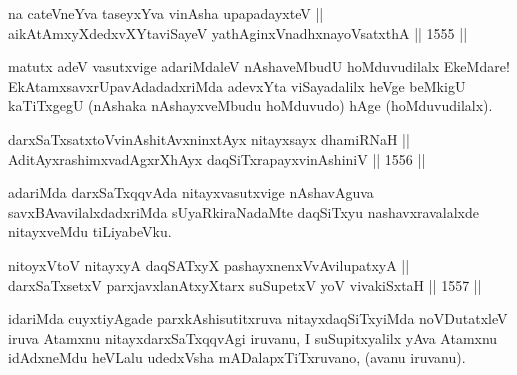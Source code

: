 
\begin{shl}
na ca\footnotemark[2] teVneYva taseyxYva vinAsha upapadayxteV || \\
aikAtAmxyXdedxvXYtaviSayeV yathA\s ginxVnadhxnayoVsatxthA ||  1555 ||  
\end{shl}

\begin{artha}
matutx adeV vasutxvige adariMdaleV nAshaveMbudU hoMduvudilalx EkeMdare! EkAtamxsavxrUpavAdadadxriMda adevxYta viSayadalilx heVge beMkigU kaTiTxgegU (nAshaka nAshayxveMbudu hoMduvudo) hAge (hoMduvudilalx).
\end{artha}


\begin{shl}
\footnotemark[3]darxSaTxsatxtoV\s vinAshitAvxninxtAyx nitayxsayx dhamiRNaH ||  \\
AditAyxrashimxvadAgxrXhAyx daqSiTxrapayxvinAshiniV ||  1556 ||
\end{shl}

\begin{artha}
adariMda darxSaTxqqvAda nitayxvasutxvige nAshavAguva savxBAvavilalxdadxriMda sUyaRkiraNadaMte daqSiTxyu nashavxravalalxde nitayxveMdu tiLiyabeVku.
\end{artha}


\begin{shl}
nitoyxV\s toV nitayxyA daqSATxyX pashayxnenxVvAvilupatxyA || \\
darxSaTx\s \s setxV parxjavxlanAtxyX\s tarx suSupetxV yoV vivakiSxtaH ||  1557 ||  
\end{shl}

\begin{artha}
idariMda cuyxtiyAgade parxkAshisutitxruva nitayxdaqSiTxyiMda noVDutatxleV iruva Atamxnu nitayxdarxSaTxqqvAgi iruvanu, I suSupitxyalilx yAva Atamxnu idAdxneMdu heVLalu udedxVsha mADalapxTiTxruvano, (avanu iruvanu).
\end{artha}


